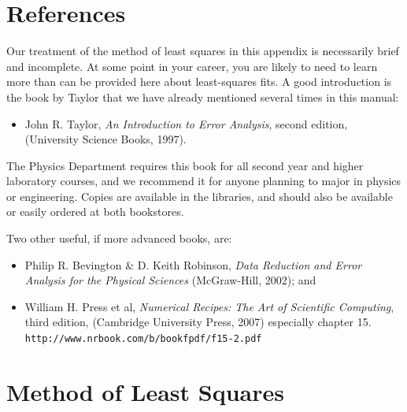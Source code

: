\section*{References}

Our treatment of the method of least squares in this appendix is
necessarily brief and incomplete.  At some point in your career, you
are likely to need to learn more
than can be provided here about least-squares fits.  
A good introduction is the book by
Taylor that we have already mentioned several times in this manual:

\begin{itemize}
   \item     John R.  Taylor, {\em An Introduction
to Error Analysis}, second edition, (University Science Books, 1997).
\end{itemize}

The Physics Department requires this book for all second year and
higher laboratory courses, and we recommend it for anyone planning to
major in physics or engineering.  Copies are available in the libraries,
and should also be available or easily ordered at both bookstores.

Two other useful, if more advanced books, are:

\begin{itemize}
\item Philip R.  Bevington \& D. Keith Robinson, {\em Data Reduction and
Error Analysis for the
Physical Sciences} (McGraw-Hill, 2002); and
%
\item  William H. Press et al,
{\em Numerical Recipes: The Art of Scientific Computing}, third edition, (Cambridge
University Press, 2007) especially chapter 15.\\
{\tt http://www.nrbook.com/b/bookfpdf/f15-2.pdf}
\end{itemize}


\section*{Method of Least Squares}


